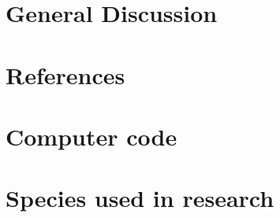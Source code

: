 \documentclass[titlesmallcaps,copyrightpage,examinerscopy]{uomthesis}
\begin{document}
%
\chapter{General Discussion}\label{sec:conc}

%

{
\backmatter
\chapter{References}

}

\clearpage
\appendix
{}

%
\chapter{Computer code}\label{apx:A}

%
\chapter{Species used in research}\label{apx:B}



%


%
%
%
\end{document}
